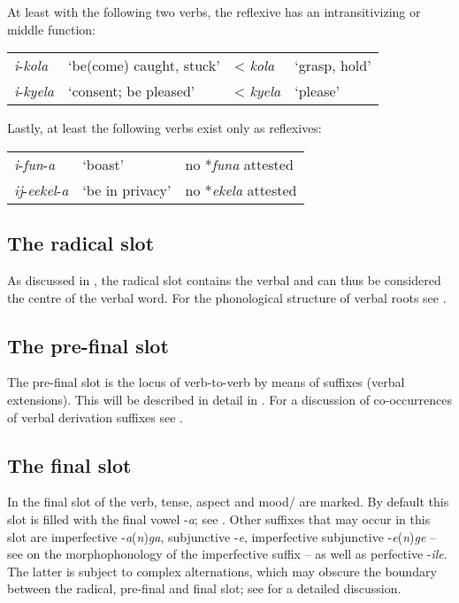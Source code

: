 At least with the following two verbs, the reflexive has an intransitivizing or middle function:
\begin{exe}
	\ex
	\begin{tabular}[t]{llll}
		\textit{i}-\textit{kola} & \lq be(come) caught, stuck' & < \textit{kola} & \lq grasp, hold'\\
		\textit{i}-\textit{kyela} & \lq consent; be pleased' & < \textit{kyela} & \lq please'
	\end{tabular}
\end{exe}

Lastly, at least the following verbs exist only as reflexives:
\begin{exe}
	\ex
	\begin{tabular}[t]{lll}
		\textit{i}-\textit{fun}-\textit{a} & \lq boast'& no *\textit{funa} attested\\
		\textit{ij}-\textit{eekel}-\textit{a} & \lq be in privacy' & no *\textit{ekela} attested
	\end{tabular}
\end{exe}
 

\subsection{The radical slot}
As discussed in , the radical slot contains the verbal  and can thus be considered the centre of the verbal word. For the phonological structure of verbal roots see .

\subsection{The pre-final slot}
The pre-final slot is the locus of verb-to-verb  by means of suffixes (verbal extensions). This will be described in detail in . For a discussion of co-occurrences of verbal derivation suffixes see .

\subsection{The final slot}\label{FinalSlot}
In the final slot of the verb, tense, aspect and  {mood}/ are marked. By default this slot is filled with the final vowel -\textit{a}; see . Other suffixes that may occur in this slot are imperfective -\textit{a}(\textit{n})\textit{ga}, subjunctive -\textit{e}, imperfective subjunctive -\textit{e}(\textit{n})\textit{ge} -- see  on the morphophonology of the imperfective suffix -- as well as perfective -\textit{ile}. The latter is subject to complex alternations, which may obscure the boundary between the radical, pre-final and final slot; see  for a detailed discussion.


